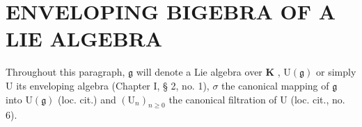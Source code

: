 \section{ENVELOPING BIGEBRA OF A LIE ALGEBRA}

Throughout this paragraph, \(\mathfrak{g}\) will denote a Lie algebra over \(\mathbf{K}\) , \(\mathrm{U}(\mathfrak{g})\) or simply \(\mathrm{U}\) its enveloping algebra (Chapter I, § 2, no. 1), \(\sigma\) the canonical mapping of \(\mathfrak{g}\) into \(\mathrm{U}(\mathfrak{g})\) (loc. cit.) and \((\mathrm{U}_n)_{n\geqslant 0}\) the canonical filtration of \(\mathrm{U}\) (loc. cit., no. 6).

